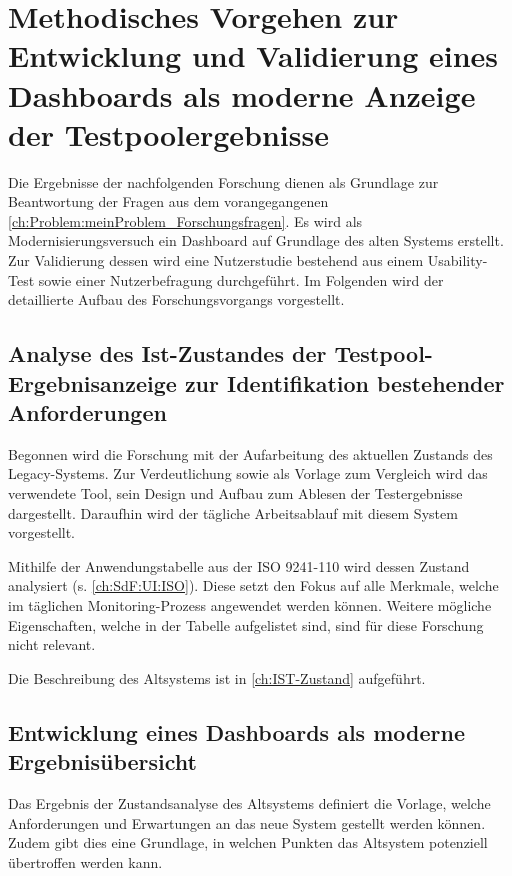 \section{Methodisches Vorgehen zur Entwicklung und Validierung eines Dash\-boards als moderne Anzeige der Testpoolergebnisse}
\label{ch:Problem:Methodik}

Die Ergebnisse der nachfolgenden Forschung dienen als Grundlage zur Beantwortung der Fragen aus dem vorangegangenen \autoref{ch:Problem:meinProblem_Forschungsfragen}. Es wird als Modernisierungsversuch ein Dash\-board auf Grundlage des alten Systems erstellt. Zur Validierung dessen wird eine Nutzerstudie bestehend aus einem Usability-Test sowie einer Nutzerbefragung durchgeführt. Im Folgenden wird der detaillierte Aufbau des Forschungsvorgangs vorgestellt.

\subsection{Analyse des Ist-Zustandes der Testpool-Ergebnisanzeige zur Identifikation bestehender Anforderungen}

Begonnen wird die Forschung mit der Aufarbeitung des aktuellen Zustands des Legacy-Systems. Zur Verdeutlichung sowie als Vorlage zum Vergleich wird das verwendete Tool, sein Design und Aufbau zum Ablesen der Testergebnisse dargestellt. Daraufhin wird der tägliche Arbeitsablauf mit diesem System vorgestellt.

Mithilfe der Anwendungstabelle aus der ISO 9241-110 wird dessen Zustand analysiert (s. \autoref{ch:SdF:UI:ISO}). Diese setzt den Fokus auf alle Merkmale, welche im täglichen Monitoring-Prozess angewendet werden können. Weitere mögliche Eigenschaften, welche in der Tabelle aufgelistet sind, sind für diese Forschung nicht relevant.

Die Beschreibung des Altsystems ist in \autoref{ch:IST-Zustand} aufgeführt.

\subsection{Entwicklung eines Dashboards als moderne Ergebnisübersicht}

Das Ergebnis der Zustandsanalyse des Altsystems definiert die Vorlage, welche Anforderungen und Erwartungen an das neue System gestellt werden können. Zudem gibt dies eine Grundlage, in welchen Punkten das Altsystem potenziell übertroffen werden kann.

